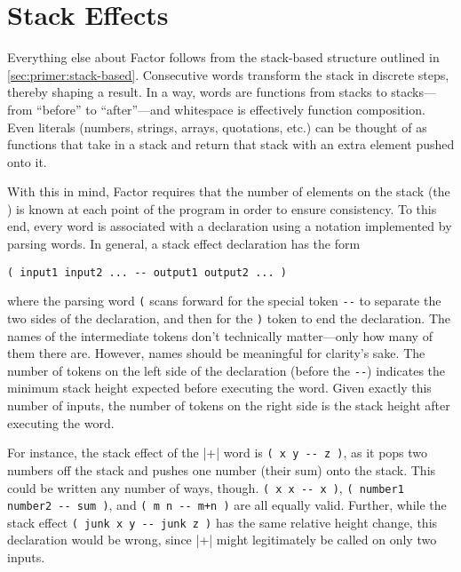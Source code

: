 \section{Stack Effects}\label{sec:primer:effects}

Everything else about Factor follows from the stack-based structure outlined in
\cref{sec:primer:stack-based}.  Consecutive words transform the stack in
discrete steps, thereby shaping a result.  In a way, words are functions from
stacks to stacks---from ``before'' to ``after''---and whitespace is effectively
function composition.  Even literals (numbers, strings, arrays, quotations,
etc.) can be thought of as functions that take in a stack and return that stack
with an extra element pushed onto it.

With this in mind, Factor requires that the number of elements on the stack
(the ) is known at each point of the program in order to
ensure consistency.  To this end, every word is associated with a  declaration using a notation implemented by parsing words.  In general,
a stack effect declaration has the form
%
\begin{center} \Verb|( input1 input2 ... -- output1 output2 ... )| \end{center}
%
\noindent where the parsing word \Verb|(| scans forward for the special token
\Verb|--| to separate the two sides of the declaration, and then for the
\Verb|)| token to end the declaration.  The names of the intermediate tokens
don't technically matter---only how many of them there are.  However, names
should be meaningful for clarity's sake.  The number of tokens on the left side
of the declaration (before the \Verb|--|) indicates the minimum stack height
expected before executing the word.  Given exactly this number of inputs, the
number of tokens on the right side is the stack height after executing the
word.

For instance, the stack effect of the \factor|+| word is
%
\Verb|( x y -- z )|,
%
as it pops two numbers off the stack and pushes one number (their sum) onto the
stack.  This could be written any number of ways, though.
%
\Verb|( x x -- x )|,
%
\Verb|( number1 number2 -- sum )|,
%
and
%
\Verb|( m n -- m+n )|
%
are all equally valid.  Further, while the stack effect
%
\Verb|( junk x y -- junk z )|
%
has the same relative height change, this declaration would be wrong, since
\factor|+| might legitimately be called on only two inputs.


